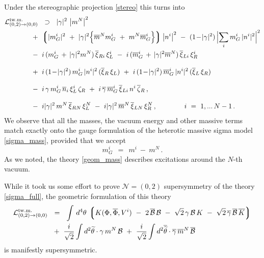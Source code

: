 \documentclass[12pt]{article}
\newcommand{\ntwoo}{${\mathcal N}= \left(0,2\right) $ }
\newcommand{\wt}{\widetilde}
\newcommand{\ov}{\overline}
\newcommand{\mc}[1]{\mathcal{#1}}
\newcommand{\lgr}{\left\lgroup}
\newcommand{\rgr}{\right\rgroup}
\newcommand{\bxir}{\ov{\xi}{}_R}
\newcommand{\bxil}{\ov{\xi}{}_L}
\newcommand{\xir}{\xi_R}
\newcommand{\xil}{\xi_L}
\newcommand{\bzr}{\ov{\zeta}{}_R}
\newcommand{\zr}{\zeta_R}
\newcommand{\bgamma}{\ov{\gamma}}
\newcommand{\bxi}{\ov{\xi}{}}
\begin{document}
	Under the stereographic projection \eqref{stereo} this turns into
\begin{align*}
%
	\mc{L}_{(0,2)\to(0,0)}^\text{tw.m.} & 
	~~\supset~~ 
	|\gamma|^2\, \left|m^N\right|^2 
	\\
%
	&\!\!\!\!\!\!\!\!
	~+~
	\lgr |m_G^i|^2 ~+~
		|\gamma|^2 \Bigl\{ \ov{m}{}^N m_G^i ~+~ m^N \ov{m}{}_G^i \Bigr\} \rgr \left|n^i \right|^2 
	~-~ (1 \!-\! |\gamma|^2)\, \Bigl| \sum_i m_G^i\, |n^i|^2 \Bigr|^2 
	\\
%
	&\!\!\!\!\!\!\!\!
	~-~ i\, ( m_G^i \,+\, |\gamma|^2 m^N )\, \bxi_{Ri}\, \xi_L^i
	~-~ i\, (\ov{m}{}_G^i \,+\, |\gamma|^2 \ov{m}{}^N )\, \bxi_{Li}\, \xi_R^i
	\\[3mm]
%
	&\!\!\!\!\!\!\!\!
	~+~ i\,(1\!-\!|\gamma|^2)\, m_G^i\,|n^i|^2\, (\bxir\,\xil) 
	~+~ i\,(1\!-\!|\gamma|^2)\, \ov{m}{}_G^i\,|n^i|^2\, (\bxil\,\xir)
	\\[3mm]
%
	&\!\!\!\!\!\!\!\!
	~-~ i\,\gamma\, m_G^i\,\ov{n}{}_i\, \xi_L^i\, \zr
	~+~ i\,\bgamma\, \ov{m}{}_G^i\, \bxi_{Li}\, n^i\, \bzr\,,
	\\[3mm]
%
	&\!\!\!\!\!\!\!\!
	~-~ i |\gamma|^2\, m^N\, \ov{\xi}{}_{RN}\, \xi_L^N
	~-~ i |\gamma|^2\, \ov{m}^N\, \ov{\xi}{}_{LN}\, \xi_R^N\,,
	\qquad\qquad
	i ~=~ 1,...\,N-1\,.
\end{align*}
	We observe that all the masses, the vacuum energy and other massive terms match exactly
	onto the gauge formulation of the heterotic massive sigma model \eqref{sigma_mass}, provided that
	we accept
\[
	m_G^i ~~=~~ m^i ~-~ m^N \,.
\]
	As we noted, the theory \eqref{geom_mass} describes excitations around the $N$-th vacuum.

	While it took us some effort to prove \ntwoo supersymmetry of the theory \eqref{sigma_full},
	the geometric formulation of this theory 
\begin{align*}
	\mc{L}_{(0,2)\to(0,0)}^\text{tw.m.} & 
	~~=~~ \int\, d^4\theta\, \lgr K(\Phi,\ov{\Phi}, V^i) 
		~-~ 2\, \ov{\mc{B}}\,\mc{B}  
		~-~  \sqrt{2}\, \gamma\,\mc{B}\,K  ~-~ \sqrt{2}\, \ov{\gamma}\,\ov{\mc{B}}\,\ov{K} \rgr
	\\
%
	&~
	~+~ \frac{i}{\sqrt{2}} \int d^2\wt{\theta} \cdot \gamma\,m^N\,\mc{B} 
	~+~ \frac{i}{\sqrt{2}} \int d^2\ov{\wt{\theta}} \cdot \bgamma\, \ov{m}{}^N\, \ov{\mc{B}}
\end{align*}
	is manifestly supersymmetric.
\end{document}

